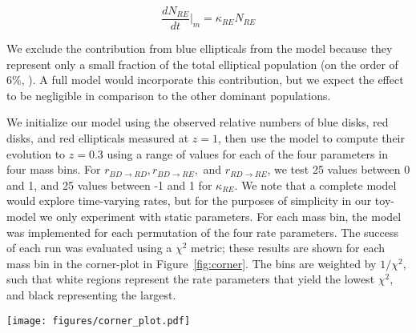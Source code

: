 \begin{equation}
\frac{dN_{RE}}{dt}\Big\rvert_{m} = \kappa_{RE} N_{RE}  
\label{eqn:RE}
\end{equation}

We exclude the contribution from blue ellipticals from the model because they represent only a small fraction of the total elliptical population (on the order of 6\%, \citet{Schawinski2014}). A full model would incorporate this contribution, but we expect the effect to be negligible in comparison to the other dominant populations. 

We initialize our model using the observed relative numbers of blue disks, red disks, and red ellipticals measured at $z=1$, then use the model to compute their evolution to $z=0.3$ using a range of values for each of the four parameters in four mass bins. For $r_{BD \rightarrow RD}, r_{BD \rightarrow RE},$ and $r_{RD \rightarrow RE}$, we test 25 values between 0 and 1, and 25 values between -1 and 1 for $\kappa_{RE}$. We note that a complete model would explore time-varying rates, but for the purposes of simplicity in our toy-model we only experiment with static parameters. For each mass bin, the model was implemented for each permutation of the four rate parameters. The success of each run was evaluated using a $\chi^2$ metric; these results are shown for each mass bin in the corner-plot in Figure~\ref{fig:corner}. The bins are weighted by $1/\chi^2$, such that white regions represent the rate parameters that yield the lowest $\chi^2$, and black representing the largest.

\begin{figure*}
\centering
\texttt{[image: figures/corner\_plot.pdf]}
\caption{Results of the grid-search for the best-fit rate parameters $r_{BD \rightarrow RD}, r_{BD \rightarrow RE}, r_{RD \rightarrow RE}$, and $\kappa_{RE}$ for four mass bins. The units for all rate parameters is $\rm Gyr^{-1}$. 25 equally-spaced values were tested between (0,1) for each parameter, with the exception of $\kappa_{RE}$ which was tested for 25 values between (-1,1); these are represented by the 25 bins on each axis. Each bin is weighted by $1/\chi^2$, such that white regions correspond to parameters which produced the lowest $\chi^2$, and black representing the highest. There is a strong result in the dependence of $r_{BD \rightarrow RD}$ with mass, such that the fraction of blue disks which transition to red disks (ie, quench without disrupting the disk), increases for more massive galaxies. The other parameters are less constrained by this model; therefore a more complex semi-analytic model will be necessary for obtaining the precise values of these rates, and is the subject of future work.}
\label{fig:corner}
\end{figure*} 


